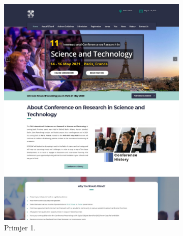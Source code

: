 		\begin{figure}[H]
			\centering
			\begin{subfigure}{0.4\textwidth}
				\includegraphics[width=\linewidth]{slike/frontpage_example1}
				\caption{Primjer 1.}
				\label{frontpage_example1}
			\end{subfigure}
			\begin{subfigure}{0.4\linewidth}

\end{subfigure}
\end{figure}
